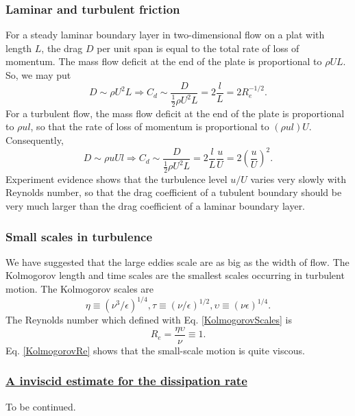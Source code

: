 \documentclass[review]{elsarticle}
\begin{document}
		\subsubsection{Laminar and turbulent friction}
			For a steady laminar boundary layer in two-dimensional flow on a plat with length $L$, the drag $D$ per unit span 
			is equal to the total rate of loss of momentum. The mass flow deficit at the end of the plate is proportional to 
			$\rho UL$. So, we may put 
			\begin{equation} 
				D \sim \rho U^2L \Rightarrow C_d \sim \frac{D}{\frac{1}{2}\rho U^2L}=2\frac{l}{L}=2R_e^{-1/2}.
			\end{equation} 
			For a turbulent flow, the mass flow deficit at the end of the plate is proportional to $\rho ul$, so that the rate of 
			loss of momentum is proportional to $(\rho ul)U$. Consequently,
			\begin{equation}
				D \sim \rho uUl \Rightarrow C_d \sim \frac{D}{\frac{1}{2}\rho U^2L}=2\frac{l}{L}\frac{u}{U}=2\left( \frac{u}{U}\right)^2.
			\end{equation}	 
			Experiment evidence shows that the turbulence level $u/U$ varies very slowly with Reynolds number, so that the drag 
			coefficient of a tubulent boundary should be very much larger than the drag coefficient of a laminar boundary layer.
		\subsubsection{Small scales in turbulence}
			We have suggested that the large eddies scale are as big as the width of flow. The Kolmogorov length and time scales 
			are the smallest scales occurring in turbulent motion. The Kolmogorov scales are
			\begin{equation}\label{KolmogorovScales}
				\eta \equiv \left( \nu ^3 / \epsilon \right)^{1/4}, \tau \equiv \left( \nu / \epsilon \right)^{1/2},
				\upsilon \equiv \left( \nu \epsilon \right)^{1/4}.
			\end{equation}
			The Reynolds number which defined with Eq. \ref{KolmogorovScales} is
			\begin{equation}\label{KolmogorovRe}
				R_e = \frac{\eta\upsilon}{\nu} \equiv 1.
			\end{equation}
			Eq. \ref{KolmogorovRe} shows that the small-scale motion is quite viscous.
	 
			
		\subsubsection{\underline{A inviscid estimate for the dissipation rate}}
			To be continued.
\end{document}

